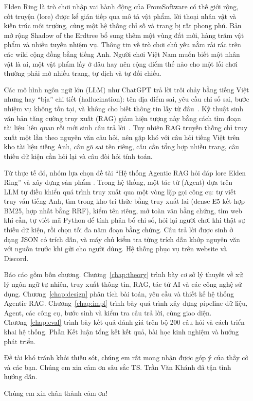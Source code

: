 \label{chap:introduction}

Elden Ring là trò chơi nhập vai hành động của FromSoftware có thế giới rộng, cốt truyện (lore) được kể gián tiếp qua mô tả vật phẩm, lời thoại nhân vật và kiến trúc môi trường, cùng một hệ thống chỉ số và trang bị rất phong phú. Bản mở rộng Shadow of the Erdtree bổ sung thêm một vùng đất mới, hàng trăm vật phẩm và nhiều tuyến nhiệm vụ. Thông tin về trò chơi chủ yếu nằm rải rác trên các wiki cộng đồng bằng tiếng Anh. Người chơi Việt Nam muốn biết một nhân vật là ai, một vật phẩm lấy ở đâu hay nên cộng điểm thế nào cho một lối chơi thường phải mở nhiều trang, tự dịch và tự đối chiếu.

Các mô hình ngôn ngữ lớn (LLM) như ChatGPT trả lời trôi chảy bằng tiếng Việt nhưng hay ``bịa'' chi tiết (hallucination): tên địa điểm sai, yêu cầu chỉ số sai, bước nhiệm vụ không tồn tại, và không cho biết thông tin lấy từ đâu~\cite{ji2023hallucination}. Kỹ thuật sinh văn bản tăng cường truy xuất (RAG) giảm hiện tượng này bằng cách tìm đoạn tài liệu liên quan rồi mới sinh câu trả lời~\cite{lewis2020rag,gao2023ragsurvey}. Tuy nhiên RAG truyền thống chỉ truy xuất một lần theo nguyên văn câu hỏi, nên gặp khó với câu hỏi tiếng Việt trên kho tài liệu tiếng Anh, câu gõ sai tên riêng, câu cần tổng hợp nhiều trang, câu thiếu dữ kiện cần hỏi lại và câu đòi hỏi tính toán.

Từ thực tế đó, nhóm lựa chọn đề tài ``Hệ thống Agentic RAG hỏi đáp lore Elden Ring'' và xây dựng sản phẩm \IB{}. Trong hệ thống, một tác tử (Agent) dựa trên LLM tự điều khiển quá trình truy xuất qua một vòng lặp gọi công cụ: tự viết truy vấn tiếng Anh, tìm trong kho tri thức bằng truy xuất lai (dense E5 kết hợp BM25, hợp nhất bằng RRF), kiểm tên riêng, mở toàn văn bằng chứng, tìm web khi cần, tự viết mã Python để tính phân bổ chỉ số, hỏi lại người chơi khi thật sự thiếu dữ kiện, rồi chọn tối đa năm đoạn bằng chứng. Câu trả lời được sinh ở dạng JSON có trích dẫn, và máy chủ kiểm tra từng trích dẫn khớp nguyên văn với nguồn trước khi gửi cho người dùng. Hệ thống phục vụ trên website và Discord.

Báo cáo gồm bốn chương. Chương~\ref{chap:theory} trình bày cơ sở lý thuyết về xử lý ngôn ngữ tự nhiên, truy xuất thông tin, RAG, tác tử AI và các công nghệ sử dụng. Chương~\ref{chap:design} phân tích bài toán, yêu cầu và thiết kế hệ thống Agentic RAG. Chương~\ref{chap:impl} trình bày quá trình xây dựng pipeline dữ liệu, Agent, các công cụ, bước sinh và kiểm tra câu trả lời, cùng giao diện. Chương~\ref{chap:eval} trình bày kết quả đánh giá trên bộ 200 câu hỏi và cách triển khai hệ thống. Phần Kết luận tổng kết kết quả, bài học kinh nghiệm và hướng phát triển.

Đề tài khó tránh khỏi thiếu sót, chúng em rất mong nhận được góp ý của thầy cô và các bạn. Chúng em xin cảm ơn sâu sắc TS. Trần Văn Khánh đã tận tình hướng dẫn.

Chúng em xin chân thành cảm ơn!
